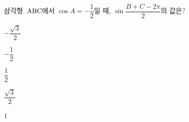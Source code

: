 삼각형~$\mathrm{ABC}$에서 $\cos A=-\dfrac{1}{2}$일 때, $\sin\dfrac{B+C-2\pi}{2}$의 \mbox{값은?}
\begin{choices32}{\rule[-3ex]{0pt}{8ex}$-\dfrac{\sqrt{3}}{2}$}{\rule[-3ex]{0pt}{8ex}$-\dfrac{1}{2}$}{\rule[-3ex]{0pt}{8ex}$\dfrac{1}{2}$}{\rule[-3ex]{0pt}{8ex}$\dfrac{\sqrt{3}}{2}$}{\rule[-3ex]{0pt}{8ex}$1$}\end{choices32}
